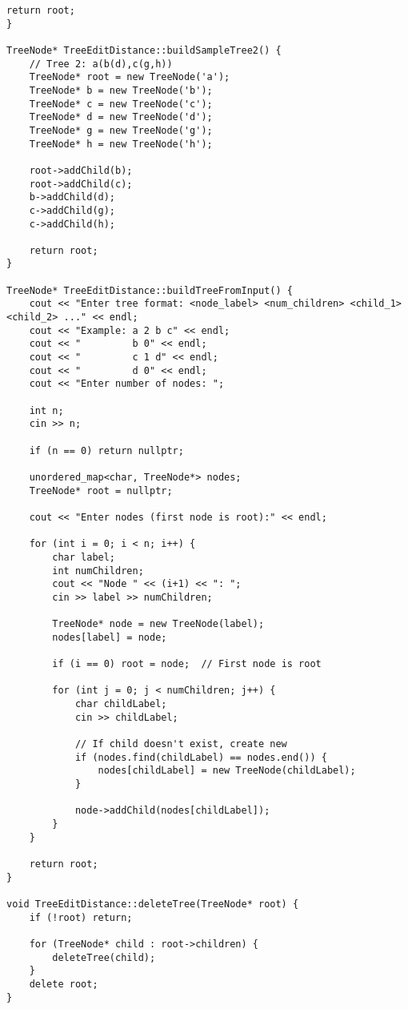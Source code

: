 \documentclass[12pt]{article}
\begin{document}
\begin{lstlisting}[caption=Complete Tree Edit Distance Implementation]
    return root;
}

TreeNode* TreeEditDistance::buildSampleTree2() {
    // Tree 2: a(b(d),c(g,h))
    TreeNode* root = new TreeNode('a');
    TreeNode* b = new TreeNode('b');
    TreeNode* c = new TreeNode('c');
    TreeNode* d = new TreeNode('d');
    TreeNode* g = new TreeNode('g');
    TreeNode* h = new TreeNode('h');
    
    root->addChild(b);
    root->addChild(c);
    b->addChild(d);
    c->addChild(g);
    c->addChild(h);
    
    return root;
}

TreeNode* TreeEditDistance::buildTreeFromInput() {
    cout << "Enter tree format: <node_label> <num_children> <child_1> <child_2> ..." << endl;
    cout << "Example: a 2 b c" << endl;
    cout << "         b 0" << endl;
    cout << "         c 1 d" << endl;
    cout << "         d 0" << endl;
    cout << "Enter number of nodes: ";
    
    int n;
    cin >> n;
    
    if (n == 0) return nullptr;
    
    unordered_map<char, TreeNode*> nodes;
    TreeNode* root = nullptr;
    
    cout << "Enter nodes (first node is root):" << endl;
    
    for (int i = 0; i < n; i++) {
        char label;
        int numChildren;
        cout << "Node " << (i+1) << ": ";
        cin >> label >> numChildren;
        
        TreeNode* node = new TreeNode(label);
        nodes[label] = node;
        
        if (i == 0) root = node;  // First node is root
        
        for (int j = 0; j < numChildren; j++) {
            char childLabel;
            cin >> childLabel;
            
            // If child doesn't exist, create new
            if (nodes.find(childLabel) == nodes.end()) {
                nodes[childLabel] = new TreeNode(childLabel);
            }
            
            node->addChild(nodes[childLabel]);
        }
    }
    
    return root;
}

void TreeEditDistance::deleteTree(TreeNode* root) {
    if (!root) return;
    
    for (TreeNode* child : root->children) {
        deleteTree(child);
    }
    delete root;
}


\end{lstlisting}
\end{document}
